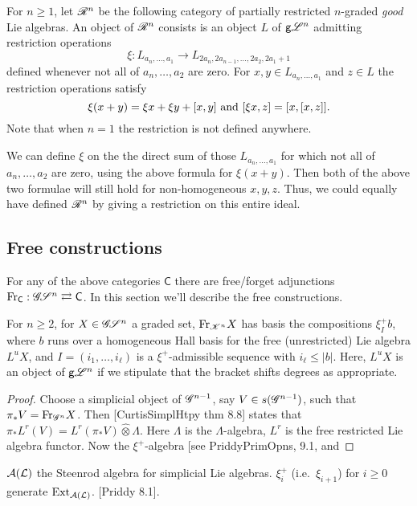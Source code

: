 \documentclass[11pt]{article}
\newcommand{\GoodLie}[1]{\mathsf{g}{\scrL}^{#1}}%
\newcommand{\LL}[1]{{\scrK}^{#1}}%
\newcommand{\PR}[1]{\scrR^{#1}}%
\newcommand{\GR}[1]{\scrG^{#1}}%
\newcommand{\GS}[1]{\scrG\!\scrS^{#1}}
\newcommand{\restn}[1]{\xi{#1}}
\newcommand{\Fr}[1]{\mathrm{Fr}_{#1}}
\newcommand{\LambdaOp}{\xi^{+}}
\begin{document}
\begin{itemize}
For $n\geq1$, let $\PR{n}$ be the following category of partially restricted $n$-graded \emph{good} Lie algebras. An object of $\PR{n}$ consists is an object $L$ of $\GoodLie{n}$
admitting restriction operations
\[\restn{}:L_{a_n,\ldots,a_1}\to L_{2a_n,2a_{n-1},\ldots,2a_2,2a_1+1}\]
defined whenever not all of $a_n,\ldots,a_{2}$ are zero. %
For $x,y\in L_{a_n,\ldots,a_1}$ and $z\in L$ the restriction operations satisfy \[\restn{(x+y)}=\restn{x}+\restn{y}+[x,y]\textup{ and }[\restn{x},z]=[x,[x,z]].\]
Note that when $n=1$ the restriction is not defined anywhere.
\begin{shaded}\noindent
We can define $\restn{}$ on the the direct sum of those $L_{a_n,\ldots,a_1}$ for which not all of $a_n,\ldots,a_2$ are zero, using the above formula for $\restn{(x+y)}$. Then both of the above two formulae will still hold for non-homogeneous $x,y,z$. Thus, we could equally have defined $\PR{n}$ by giving a restriction on this entire ideal.
\end{shaded}

\end{itemize}

\subsection*{Free constructions}
For any of the above categories $\mathsf{C}$ there are free/forget adjunctions $\Fr{\mathsf{C}}:\GS{n} \rightleftarrows \mathsf{C}$. In this section we'll describe the free constructions.

\begin{prop*}
For $n\geq2$, for $X\in\GS{n}$ a graded set, $\Fr{\LL{n}}X$ has basis the compositions $\LambdaOp_{I}b$, where $b$ runs over a homogeneous Hall basis for the free (unrestricted) Lie algebra $L^uX$, and $I=(i_1,\ldots,i_\ell)$ is a $\LambdaOp$-admissible sequence with $i_\ell\leq|b|$. Here, $L^uX$ is an object of $\GoodLie{n}$ if we stipulate that the bracket shifts degrees as appropriate.
\end{prop*}
\begin{proof}
Choose a simplicial object of $\GR{n-1}$, say $V\in s(\GR{n-1})$, such that $\pi_{*}V=\Fr{\GR{n}}X$. Then [CurtisSimplHtpy thm 8.8] states that $\pi_*L^r(V)=L^r(\pi_*V)\hat\otimes \Lambda$. Here $\Lambda$ is the $\Lambda$-algebra, $L^r$ is the free restricted Lie algebra functor. Now the $\LambdaOp$-algebra [see PriddyPrimOpns, 9.1, and 
\end{proof}

$\mathcal{A}(\mathcal{L})$ the Steenrod algebra for simplicial Lie algebras. $\LambdaOp_i$ (i.e.\ $\xi_{i+1}$) for $i\geq0$ generate $\operatorname{Ext}_{\mathcal{A}(\mathcal{L})}$. [Priddy 8.1].
\end{document}

